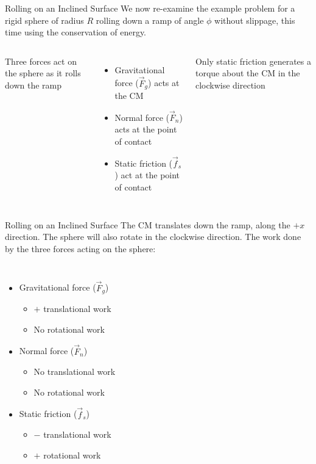 \documentclass[12pt,compress,aspectratio=169]{beamer}
\begin{document}
\begin{frame}{Rolling on an Inclined Surface}
  We now re-examine the example problem for a rigid sphere of radius
  $R$ rolling down a ramp of angle  $\phi$ without slippage, this time using
  the conservation of energy.

  \vspace{.2in}
  \begin{columns}
    

    Three forces act on the sphere as it rolls down the ramp
    \begin{itemize}
    \item Gravitational force ($\vec F_g$) acts at the CM
    \item Normal force ($\vec F_n$) acts at the point of contact
    \item Static friction ($\vec f_s$) act at the point of contact
    \end{itemize}
    Only static friction generates a torque about the CM in the clockwise
    direction
  \end{columns}
\end{frame}



\begin{frame}{Rolling on an Inclined Surface}
  The CM translates down the ramp, along the $+x$ direction. The sphere will
  also rotate in the clockwise direction. The work done by the three forces
  acting on the sphere:
  \begin{columns}
    

    
    \begin{itemize}
    \item Gravitational force ($\vec F_g$)
      \begin{itemize}
      \item $+$ translational work
      \item No rotational work
      \end{itemize}
    \item Normal force ($\vec F_n$)
      \begin{itemize}
      \item No translational work
      \item No rotational work
      \end{itemize}
    \item Static friction ($\vec f_s$)
      \begin{itemize}
      \item $-$ translational work
      \item $+$ rotational work
      \end{itemize}
    \end{itemize}
  \end{columns}
\end{frame}
\end{document}
